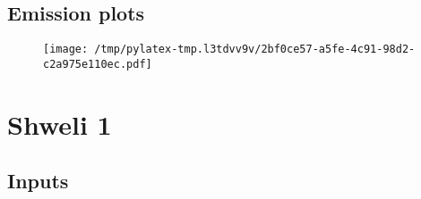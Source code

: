 \documentclass{article}%
\begin{document}
\subsection{Emission plots}%
\label{subsec:Emissionplots}%


\begin{figure}[htbp]%
\centering%
\texttt{[image: /tmp/pylatex-tmp.l3tdvv9v/2bf0ce57-a5fe-4c91-98d2-c2a975e110ec.pdf]}%
\end{figure}

%
\section{Shweli 1}%
\label{sec:Shweli1}%
\subsection{Inputs}%
\label{subsec:Inputs}%
\end{document}
